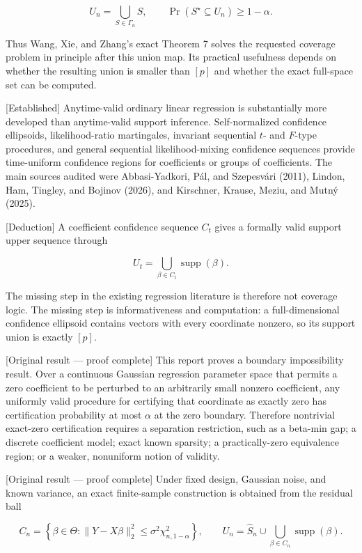 \documentclass[
  english,
  11pt,
  a4paper,
]{article}
\begin{document}
$$
U_n=\bigcup_{S\in\Gamma_n}S,
\qquad
\Pr(S^\star\subseteq U_n)\ge1-\alpha.
$$

Thus Wang, Xie, and Zhang's exact Theorem 7 solves the requested
coverage problem in principle after this union map. Its practical
usefulness depends on whether the resulting union is smaller than
$[p]$ and whether the exact full-space set can be computed.

{[}Established{]} Anytime-valid ordinary linear regression is
substantially more developed than anytime-valid support inference.
Self-normalized confidence ellipsoids, likelihood-ratio martingales,
invariant sequential $t$- and $F$-type procedures, and general
sequential likelihood-mixing confidence sequences provide time-uniform
confidence regions for coefficients or groups of coefficients. The main
sources audited were Abbasi-Yadkori, Pál, and Szepesvári (2011), Lindon,
Ham, Tingley, and Bojinov (2026), and Kirschner, Krause, Meziu, and
Mutný (2025).

{[}Deduction{]} A coefficient confidence sequence $C_t$ gives a
formally valid support upper sequence through

$$
U_t=\bigcup_{\beta\in C_t}\operatorname{supp}(\beta).
$$

The missing step in the existing regression literature is therefore not
coverage logic. The missing step is informativeness and computation: a
full-dimensional confidence ellipsoid contains vectors with every
coordinate nonzero, so its support union is exactly $[p]$.

{[}Original result --- proof complete{]} This report proves a boundary
impossibility result. Over a continuous Gaussian regression parameter
space that permits a zero coefficient to be perturbed to an arbitrarily
small nonzero coefficient, any uniformly valid procedure for certifying
that coordinate as exactly zero has certification probability at most
$\alpha$ at the zero boundary. Therefore nontrivial exact-zero
certification requires a separation restriction, such as a beta-min gap;
a discrete coefficient model; exact known sparsity; a practically-zero
equivalence region; or a weaker, nonuniform notion of validity.

{[}Original result --- proof complete{]} Under fixed design, Gaussian
noise, and known variance, an exact finite-sample construction is
obtained from the residual ball

$$
C_n=\left\{\beta\in\Theta:
  \lVert Y-X\beta\rVert_2^2
  \le \sigma^2\chi^2_{n,1-\alpha}
\right\},
\qquad
U_n=\widehat S_n\cup\bigcup_{\beta\in C_n}\operatorname{supp}(\beta).
$$
\end{document}
